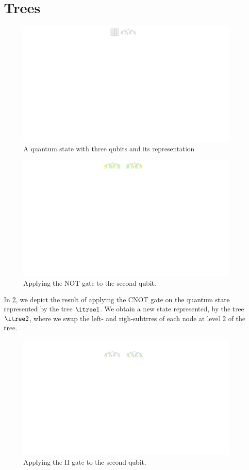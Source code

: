 
\section{Trees}
\begin{figure}
\center
\includegraphics[]{Figures/Trees/Tree}
\caption{A quantum state with three qubits and its representation}
\label{qustate:tree:fig}
\end{figure}




\begin{figure}
\center
\includegraphics[]{Figures/Trees/ApplyNOT}
\caption{Applying the NOT gate to the second qubit.}
\label{apply:not:fig}
\end{figure}
%
In \ref{apply:not:fig}, we depict the result of applying the CNOT gate on the quantum state represented by the tree $\itree1$.
%
We obtain a new state represented, by the tree $\itree2$, where we swap the left- and righ-subtrres of each node at level $2$ of the tree.

\begin{figure}
\center
\includegraphics[]{Figures/Trees/ApplyH}
\caption{Applying the H gate to the second qubit.}
\label{apply:H:fig}
\end{figure}
